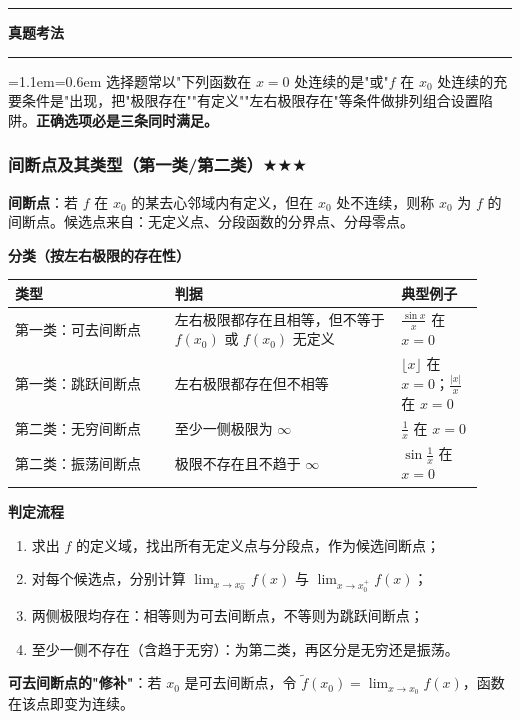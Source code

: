 \documentclass[11pt,openany,UTF8]{ctexbook}
\newcommand{\callouthead}[2]{%
  \par\addvspace{7pt}\noindent
  {\color{#1}\rule[-0.15em]{3pt}{1.05em}}\hspace{0.5em}%
  {\bfseries\color{#1}#2}\par\nobreak\vspace{-0.35em}%
  {\color{rulesep}\hrule height 0.4pt}\nobreak\vspace{0.45em}%
  \begingroup\small\setlength{\parindent}{0pt}%
  \leftskip=1.1em\rightskip=0.6em\noindent\ignorespaces}
\newcommand{\calloutend}{\par\endgroup\addvspace{7pt}}
\newenvironment{callexam}[1]{\callouthead{exambar}{#1}}{\calloutend}
\begin{document}
\begin{callexam}{真题考法}
选择题常以"下列函数在 $x=0$ 处连续的是"或"$f$ 在 $x_0$ 处连续的充要条件是"出现，把"极限存在""有定义""左右极限存在"等条件做排列组合设置陷阱。\textbf{正确选项必是三条同时满足。}

\end{callexam}

\subsubsection{间断点及其类型（第一类/第二类）$\bigstar$$\bigstar$$\bigstar$}

\textbf{间断点}：若 $f$ 在 $x_0$ 的某去心邻域内有定义，但在 $x_0$ 处不连续，则称 $x_0$ 为 $f$ 的间断点。候选点来自：无定义点、分段函数的分界点、分母零点。

\textbf{分类（按左右极限的存在性）}

\begingroup\small\setlength{\tabcolsep}{4.0pt}
\begin{longtable}{@{}L{0.3150\linewidth}L{0.4477\linewidth}L{0.1658\linewidth}@{}}
\toprule
\textbf{类型} & \textbf{判据} & \textbf{典型例子} \\
\midrule
\endhead
第一类：可去间断点 & 左右极限都存在且相等，但不等于 $f(x_0)$ 或 $f(x_0)$ 无定义 & $\frac{\sin x}{x}$ 在 $x=0$ \\
第一类：跳跃间断点 & 左右极限都存在但不相等 & $\lfloor x\rfloor$ 在 $x=0$；$\frac{\vert x\vert}{x}$ 在 $x=0$ \\
第二类：无穷间断点 & 至少一侧极限为 $\infty$ & $\frac1x$ 在 $x=0$ \\
第二类：振荡间断点 & 极限不存在且不趋于 $\infty$ & $\sin\frac1x$ 在 $x=0$ \\
\bottomrule
\end{longtable}
\endgroup

\textbf{判定流程}

\begin{enumerate}
\item 求出 $f$ 的定义域，找出所有无定义点与分段点，作为候选间断点；
\item 对每个候选点，分别计算 $\lim_{x\to x_0^-}f(x)$ 与 $\lim_{x\to x_0^+}f(x)$；
\item 两侧极限均存在：相等则为可去间断点，不等则为跳跃间断点；
\item 至少一侧不存在（含趋于无穷）：为第二类，再区分是无穷还是振荡。
\end{enumerate}
\textbf{可去间断点的"修补"}：若 $x_0$ 是可去间断点，令 $\tilde f(x_0)=\lim_{x\to x_0}f(x)$，函数在该点即变为连续。
\end{document}
